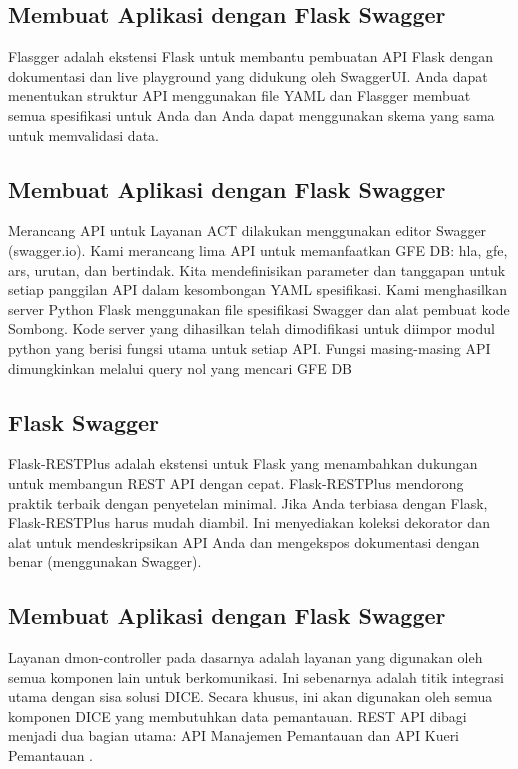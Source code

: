\documentclass[12pt]{article}
\begin{document}
\subsection{Membuat Aplikasi dengan Flask Swagger}
Flasgger adalah ekstensi Flask untuk membantu pembuatan API Flask dengan dokumentasi dan live playground yang didukung oleh SwaggerUI. Anda dapat menentukan struktur API menggunakan file YAML dan Flasgger membuat semua spesifikasi untuk Anda dan Anda dapat menggunakan skema yang sama untuk memvalidasi data.


\subsection{Membuat Aplikasi dengan Flask Swagger}
Merancang API untuk Layanan ACT dilakukan menggunakan editor Swagger (swagger.io).
Kami merancang lima API untuk memanfaatkan GFE DB: hla, gfe, ars, urutan, dan bertindak. Kita
mendefinisikan parameter dan tanggapan untuk setiap panggilan API dalam kesombongan YAML
spesifikasi. Kami menghasilkan server Python Flask menggunakan file spesifikasi Swagger
dan alat pembuat kode Sombong. Kode server yang dihasilkan telah dimodifikasi untuk diimpor
modul python yang berisi fungsi utama untuk setiap API. Fungsi masing-masing
API dimungkinkan melalui query nol yang mencari GFE DB \cite{halagan2017bioinformatics}

\subsection{Flask Swagger}
Flask-RESTPlus adalah ekstensi untuk Flask yang menambahkan dukungan untuk membangun REST API dengan cepat. Flask-RESTPlus mendorong praktik terbaik dengan penyetelan minimal. Jika Anda terbiasa dengan Flask, Flask-RESTPlus harus mudah diambil. Ini menyediakan koleksi dekorator dan alat untuk mendeskripsikan API Anda dan mengekspos dokumentasi dengan benar (menggunakan Swagger)\cite{buhler2017design}.

\subsection{Membuat Aplikasi dengan Flask Swagger}
Layanan dmon-controller pada dasarnya adalah layanan yang digunakan oleh semua komponen lain untuk berkomunikasi. Ini sebenarnya adalah titik integrasi utama dengan sisa solusi DICE. Secara khusus, ini akan digunakan oleh semua komponen DICE yang membutuhkan data pemantauan. REST API dibagi menjadi dua bagian utama: API Manajemen Pemantauan dan API Kueri Pemantauan \cite{pop2016monitoring}.
\end{document}
